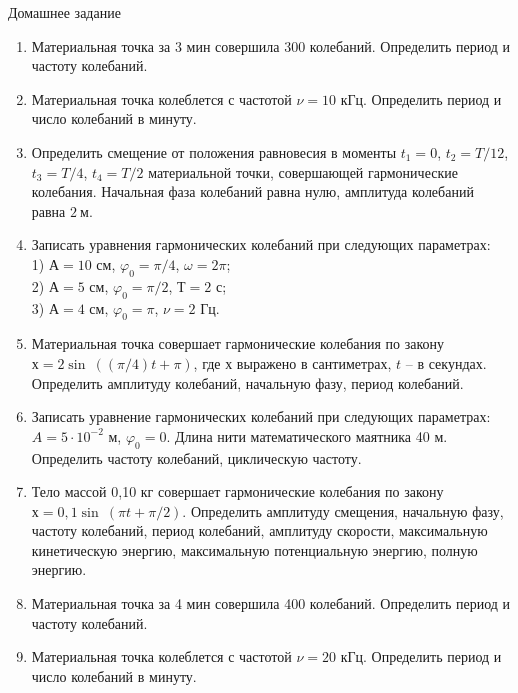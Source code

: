 \documentclass[a5paper, 10pt]{diss_4}
\renewcommand{\'}{\,'}
\begin{document}
\begin{center}
   Домашнее задание
\end{center}
\begin{enumerate}

\item Материальная точка за 3 мин совершила 300 колебаний. Определить период и частоту колебаний.

\item Материальная точка колеблется с частотой $\nu=10$ кГц. Определить период и число колебаний в минуту.

\item Определить смещение от положения равновесия в моменты $t_1=0$, $t_2=T/12$, $t_3=T/4$, $t_4=T/2$ материальной точки, совершающей гармонические колебания. Начальная фаза колебаний равна нулю, амплитуда колебаний равна $2\ м$.

\item Записать уравнения гармонических колебаний при следующих параметрах: \\
1) $А=10$ см, $\varphi_0= \pi/4$, $\omega=2\pi$; \\
2) $А=5$  см, $\varphi_0= \pi/2$, $Т=2$ с; \\
3) $А=4$  см, $\varphi_0= \pi$,   $\nu=2$ Гц.

\item Материальная точка совершает гармонические колебания по закону $х=2\sin\ ((\pi/4)t+\pi)$, где $х$ выражено в сантиметрах, $t$ -- в секундах. Определить амплитуду колебаний, начальную фазу, период колебаний.

\item Записать уравнение гармонических колебаний при следующих параметрах: $A=5\cdot10^{-2}$ м, $\varphi_0=0$. Длина нити математического маятника 40 м.  Определить частоту колебаний, циклическую частоту.

\item Тело массой 0,10 кг совершает гармонические колебания по закону $х=0,1\sin\ (\pi t+\pi/2)$. Определить амплитуду смещения, начальную фазу, частоту колебаний, период колебаний, амплитуду скорости, максимальную кинетическую энергию, максимальную потенциальную энергию, полную энергию.

\item Материальная точка за 4 мин совершила 400 колебаний. Определить период и частоту колебаний.

\item Материальная точка колеблется с частотой $\nu=20$ кГц. Определить период и число колебаний в минуту.


\end{enumerate}
\end{document}
